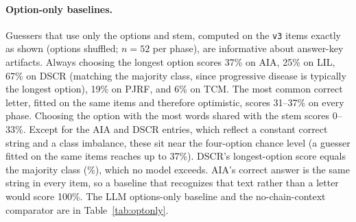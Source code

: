 \documentclass[11pt]{article}
\begin{document}
\paragraph{Option-only baselines.} Guessers that use only the options and stem, computed on the \texttt{v3} items exactly as shown (options shuffled; $n=52$ per phase), are informative about answer-key artifacts. Always choosing the longest option scores 37\% on AIA, 25\% on LIL, 67\% on DSCR (matching the majority class, since progressive disease is typically the longest option), 19\% on PJRF, and 6\% on TCM. The most common correct letter, fitted on the same items and therefore optimistic, scores 31--37\% on every phase. Choosing the option with the most words shared with the stem scores 0--33\%. Except for the AIA and DSCR entries, which reflect a constant correct string and a class imbalance, these sit near the four-option chance level (a guesser fitted on the same items reaches up to 37\%). DSCR's longest-option score equals the majority class (\dscrMajorityPct{}\%), which no model exceeds. AIA's correct answer is the same string in every item, so a baseline that recognizes that text rather than a letter would score 100\%. The LLM options-only baseline and the no-chain-context comparator are in Table~\ref{tab:optonly}.

\begin{table}[t]
\centering
\setlength{\tabcolsep}{2pt}

\caption{Accuracy (\%, $n=52$ per cell) with the options alone; with image and stem but no chain context (the ``absent'' condition of the gating-causality run, and the ordinary own-image run for AIA, which has no upstream phase); and in the ordinary own-image run, which carries the model's own earlier answers as chain context. Chance is 25\%; the majority answer text is 100\% for AIA, \dscrMajorityPct{}\% for DSCR, and 1.9\% for LIL, PJRF, and TCM. Opt.-only is options only; Own-img is the ordinary own-image run; Unpars. is the number of unparseable options-only responses; unparseable responses score incorrect. $^\dagger$ More than 20\% unparseable: a lower bound, and its paired comparison with the own-image run is suppressed as an artifact. Own-image minus options-only mixes image, stem, and the model's own upstream answers, so it is not an image effect.}
\label{tab:optonly}
\end{table}
\end{document}
